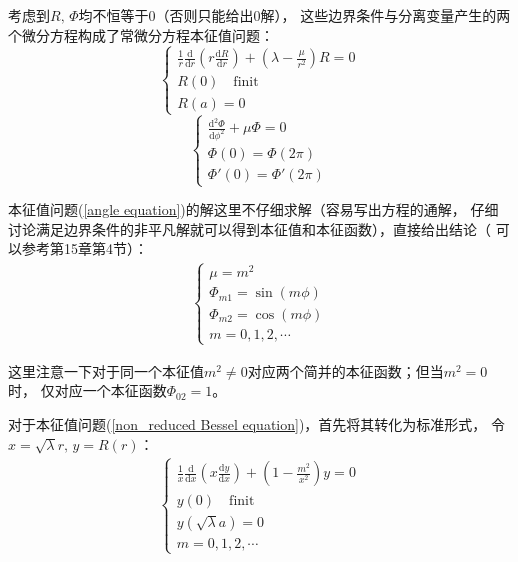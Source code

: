 \documentclass[a4paper]{ctexart}
\def\d{\mathrm{d}}
\newcommand{\mr}[1]{\mathrm{#1}}
\newcommand{\dv}[2]{\frac{\d{#1}}{\d{#2}}}
\begin{document}
	\par 考虑到$R,\, \Phi$均不恒等于0（否则只能给出0解），
	这些边界条件与分离变量产生的两个微分方程构成了常微分方程本征值问题：
	\begin{equation}
		\left\{ 
			\begin{array}{lr}
				\displaystyle\frac{1}{r}\dv{}{r}\left(r\dv{R}{r} \right) + \left(\lambda - \frac{\mu}{r^2}\right)R = 0\\
				R(0)\quad\mr{finit}\\
				R(a) = 0
			\end{array}
		\right.
		\label{non_reduced Bessel equation}
	\end{equation}
	\begin{equation}
		\left\{ 
			\begin{array}{lr}
				\displaystyle\dv{^2\Phi}{\phi^2} + \mu \Phi = 0\\
				\Phi(0) = \Phi(2\pi)\\
				\Phi'(0) = \Phi'(2\pi)
			\end{array}
		\right.
		\label{angle equation}
	\end{equation}
	\par 本征值问题(\ref{angle equation})的解这里不仔细求解（容易写出方程的通解，
	仔细讨论满足边界条件的非平凡解就可以得到本征值和本征函数），直接给出结论（
	可以参考\cite{mathematicalmethod}第15章第4节）：
	\begin{align}
		\left\{ 
			\begin{array}{lr}
				\mu = m^{2}\\
				\Phi_{m1} = \sin(m\phi)\\
				\Phi_{m2} = \cos(m\phi)\\
				m = 0,1,2,\cdots 
			\end{array}
		\right.
	\end{align}
	\par 这里注意一下对于同一个本征值$m^2 \neq 0$对应两个简并的本征函数；但当$m^2=0$时，
	仅对应一个本征函数$\Phi_{02} = 1$。
	\par 对于本征值问题(\ref{non_reduced Bessel equation})，首先将其转化为标准形式，
	令$x = \sqrt{\lambda}r,\, y = R(r)$：
	\begin{align}
		\left\{ 
			\begin{array}{lr}
				\displaystyle\frac{1}{x}\dv{}{x}\left(x\dv{y}{x} \right) + \left(1 - \frac{m^2}{x^2}\right)y = 0\\
				y(0)\quad\mr{finit}\\
				y(\sqrt{\lambda}a) = 0\\
				m = 0, 1, 2, \cdots
			\end{array}
		\right.
	\end{align}
\end{document}

